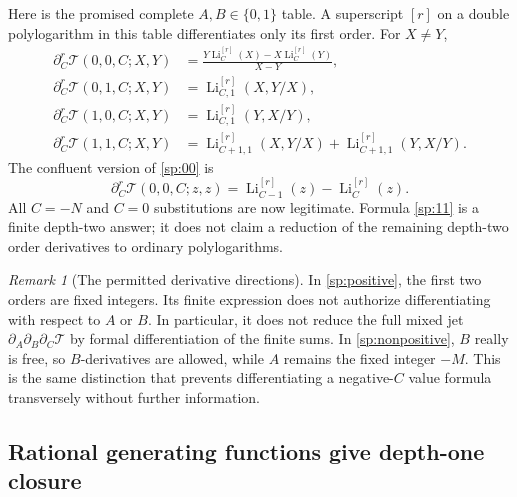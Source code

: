 \documentclass[11pt,a4paper]{article}
\theoremstyle{definition}
\theoremstyle{remark}
\newtheorem{remark}[theorem]{Remark}
\numberwithin{equation}{section}
\begin{document}
Here is the promised complete $A,B\in\{0,1\}$ table.  A superscript
$[r]$ on a double polylogarithm in this table differentiates only its
first order.  For $X\ne Y$,
\begin{align}
 \partial_C^r\mathcal T(0,0,C;X,Y)
 &=\frac{Y\operatorname{Li}_{C}^{[r]}(X)
          -X\operatorname{Li}_{C}^{[r]}(Y)}{X-Y},
 \label{sp:00}\\
 \partial_C^r\mathcal T(0,1,C;X,Y)
 &=\operatorname{Li}_{C,1}^{[r]}(X,Y/X),\label{sp:01}\\
 \partial_C^r\mathcal T(1,0,C;X,Y)
 &=\operatorname{Li}_{C,1}^{[r]}(Y,X/Y),\label{sp:10}\\
 \partial_C^r\mathcal T(1,1,C;X,Y)
 &=\operatorname{Li}_{C+1,1}^{[r]}(X,Y/X)
   +\operatorname{Li}_{C+1,1}^{[r]}(Y,X/Y).
 \label{sp:11}
\end{align}
The confluent version of \eqref{sp:00} is
\begin{equation}\label{sp:00confluent}
 \partial_C^r\mathcal T(0,0,C;z,z)
 =\operatorname{Li}_{C-1}^{[r]}(z)
    -\operatorname{Li}_{C}^{[r]}(z).
\end{equation}
All $C=-N$ and $C=0$ substitutions are now legitimate.  Formula
\eqref{sp:11} is a finite depth-two answer; it does not claim a
reduction of the remaining depth-two order derivatives to ordinary
polylogarithms.

\begin{remark}[The permitted derivative directions]
\label{sp:directionwarning}
In \eqref{sp:positive}, the first two orders are fixed integers.  Its
finite expression does not authorize differentiating with respect to
$A$ or $B$.  In particular, it does not reduce the full mixed jet
$\partial_A\partial_B\partial_C\mathcal T$ by formal differentiation
of the finite sums.  In \eqref{sp:nonpositive}, $B$ really is free,
so $B$-derivatives are allowed, while $A$ remains the fixed integer
$-M$.  This is the same distinction that prevents differentiating
a negative-$C$ value formula transversely without further information.
\end{remark}

\subsection{Rational generating functions give depth-one closure}
\end{document}
